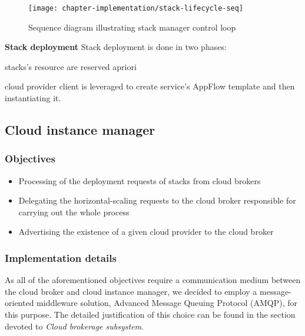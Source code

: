 \begin{asparaenum}
\begin{figure}[!ht]
  \begin{center}
    \texttt{[image: chapter-implementation/stack-lifecycle-seq]}
  \end{center}
  \caption{Sequence diagram illustrating stack manager control loop}
  \label{fig:stack-lifecycle-seq}
\end{figure}


 \item[\textbf{Stack deployment}] Stack deployment is done in two phases:
 \begin{inparaenum}
  \item stacks's resource are reserved apriori
  \item cloud provider client is leveraged to create service's AppFlow template and then instantiating it.
 \end{inparaenum}

\end{asparaenum}

\subsection{Cloud instance manager}

\subsubsection{Objectives}
\begin{itemize}
  \item Processing of the deployment requests of stacks from cloud brokers
  \item Delegating the horizontal-scaling requests to the cloud broker responsible for carrying out the whole process
  \item Advertising the existence of a given cloud provider to the cloud broker
\end{itemize}

\subsubsection{Implementation details}
As all of the aforementioned objectives require a communication medium between the cloud broker and cloud instance manager, we decided to employ a message-oriented middleware solution, Advanced Message Queuing Protocol (AMQP), for this purpose. The detailed justification of this choice can be found in the section devoted to \emph{Cloud brokerage subsystem}.  

